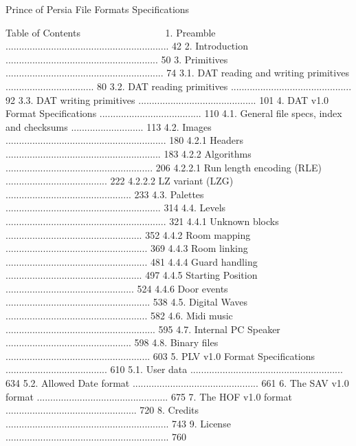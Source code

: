              
                             Prince of Persia
                               File Formats
                              Specifications

Table of Contents
~~~~~ ~~ ~~~~~~~~
1. Preamble ............................................................. 42
2. Introduction ......................................................... 50
3. Primitives ........................................................... 74
3.1. DAT reading and writing primitives ................................. 80
3.2. DAT reading primitives ............................................. 92
3.3. DAT writing primitives ............................................ 101
4. DAT v1.0 Format Specifications ...................................... 110
4.1. General file specs, index and checksums ........................... 113
4.2. Images ............................................................ 180
4.2.1 Headers .......................................................... 183
4.2.2 Algorithms ....................................................... 206
4.2.2.1 Run length encoding (RLE) ...................................... 222
4.2.2.2 LZ variant (LZG) ............................................... 233
4.3. Palettes .......................................................... 314
4.4. Levels ............................................................ 321
4.4.1 Unknown blocks ................................................... 352
4.4.2 Room mapping ..................................................... 369
4.4.3 Room linking ..................................................... 481
4.4.4 Guard handling ................................................... 497
4.4.5 Starting Position ................................................ 524
4.4.6 Door events ...................................................... 538
4.5. Digital Waves ..................................................... 582
4.6. Midi music ........................................................ 595
4.7. Internal PC Speaker ............................................... 598
4.8. Binary files ...................................................... 603
5. PLV v1.0 Format Specifications ...................................... 610
5.1. User data ......................................................... 634
5.2. Allowed Date format ............................................... 661
6. The SAV v1.0 format ................................................. 675
7. The HOF v1.0 format ................................................. 720
8. Credits ............................................................. 743
9. License ............................................................. 760


